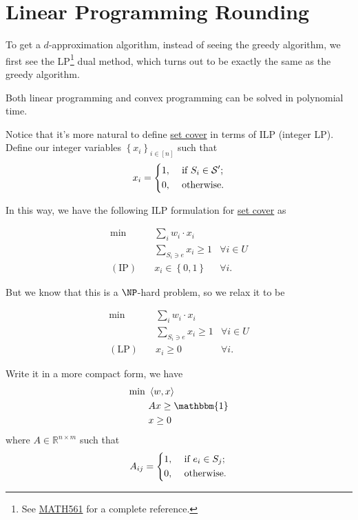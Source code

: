 \section{Linear Programming Rounding}
To get a \(d\)-approximation algorithm, instead of seeing the greedy algorithm, we first see the LP\footnote{See \href{https://www.pbb.wtf/posts/Notes\#linear-programming-math561ioe510to518-umich}{MATH561} for a complete reference.} dual method, which turns out to be exactly the same as the greedy algorithm.

\begin{prev}
	Both linear programming and convex programming can be solved in polynomial time.
\end{prev}

Notice that it's more natural to define \hyperref[prb:set-cover]{set cover} in terms of ILP (integer LP). Define our integer variables \(\left\{ x_i \right\} _{i\in [n]}\) such that
\[
	x_i = \begin{dcases}
		1, & \text{ if } S_i\in \mathcal{S} ^\prime  ; \\
		0, & \text{ otherwise}.
	\end{dcases}
\]

In this way, we have the following ILP formulation for \hyperref[prb:set-cover]{set cover} as

\[
	\begin{aligned}
		\min~            & \sum_{i} w_i \cdot x_i                           \\
		                 & \sum_{S_i\ni e}x_{i} \geq 1     & \forall i\in U \\
		(\text{IP})\quad & x_{i} \in \left\{ 0, 1 \right\} & \forall i.
	\end{aligned}
\]

But we know that this is a \(\NP\)-hard problem, so we relax it to be

\[
	\begin{aligned}
		\min~            & \sum_{i} w_i \cdot x_i                       \\
		                 & \sum_{S_i\ni e}x_{i} \geq 1 & \forall i\in U \\
		(\text{LP})\quad & x_{i} \geq 0                & \forall i.
	\end{aligned}
\]

Write it in a more compact form, we have
\[
	\begin{aligned}
		\min~ & \left\langle w, x \right\rangle \\
		      & Ax \geq \mathbbm{1}             \\
		      & x\geq 0
	\end{aligned}
\]
where \(A\in \mathbb{R} ^{n\times m}\) such that
\[
	A_{ij} = \begin{dcases}
		1, & \text{ if } e_i\in S_j ; \\
		0, & \text{ otherwise}.
	\end{dcases}
\]

